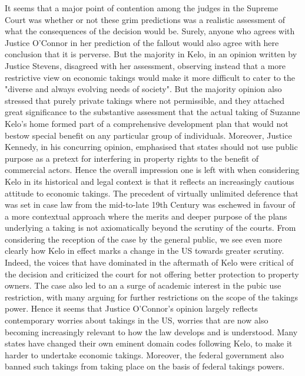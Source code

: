 It seems that a major point of contention among the judges in the Supreme Court was whether or not these grim predictions was a realistic assessment of what the consequences of the decision would be. Surely, anyone who agrees with Justice O'Connor in her prediction of the fallout would also agree with here conclusion that it is perverse. But the majority in Kelo, in an opinion written by Justice Stevens, disagreed with her assessment, observing instead that a more restrictive view on economic takings would make it more difficult to cater to the "diverse and always evolving needs of society". 
But the majority opinion also stressed that purely private takings where not permissible, and they attached great significance to the substantive assessment that the actual taking of Suzanne Kelo's home formed part of a comprehensive development plan that would not bestow special benefit on any particular group of individuals. Moreover, Justice Kennedy, in his concurring opinion, emphasised that states should not use public purpose as a pretext for interfering in property rights to the benefit of commercial actors.
Hence the overall impression one is left with when considering Kelo in its historical and legal context is that it reflects an increasingly cautious attitude to economic takings. The precedent of virtually unlimited deference that was set in case law from the mid-to-late 19th Century was eschewed in favour of a more contextual approach where the merits and deeper purpose of the plans underlying a taking is not axiomatically beyond the scrutiny of the courts.
From considering the reception of the case by the general public, we see even more clearly how Kelo in effect marks a change in the US towards greater scrutiny. Indeed, the voices that have dominated in the aftermath of Kelo were critical of the decision and criticized the court for not offering better protection to property owners. The case also led to an a surge of academic interest in the pubic use restriction, with many arguing for further restrictions on the scope of the takings power. 
Hence it seems that Justice O'Connor's opinion largely reflects contemporary worries about takings in the US, worries that are now also becoming increasingly relevant to how the law develops and is understood. Many states have changed their own eminent domain codes  following Kelo, to make it harder to undertake economic takings. Moreover, the federal government also banned such takings from taking place on the basis of federal takings powers.
